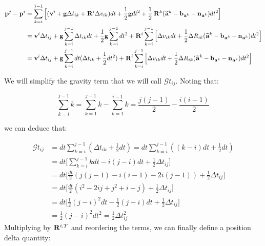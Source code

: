\documentclass[11pt]{article}
\newcommand{\Rot}[2]{\prescript{#1}{}{\bfR}_{#2}}
\newcommand{\noise}{\bfn}
\newcommand{\bias}{\bfb}
\newcommand{\posi}[2]{\prescript{#1}{}{\bfp}_{#2}}
\newcommand{\vel}[2]{\prescript{#1}{}{\bfv}_{#2}}
\newcommand{\acc}[2]{\prescript{#1}{}{\bfa}_{#2}}
\newcommand{\accm}[2]{\prescript{#1}{}{\widetilde{\bfa}}_{#2}}
\newcommand{\grav}{\bfg}
\begin{document}
\begin{equation}
\begin{split}
\posi{}{}^{j} - \posi{}{}^{i} &= \sum_{k=i}^{j-1} \Big[
(\vel{}{}^i + \grav \Delta t_{ik} + \Rot{}{}^i \Delta v_{ik})dt 
+ \frac{1}{2}\grav dt^2 + \frac{1}{2}\Rot{}{}^{k}(\accm{}{}^k - \bias_{\acc{}{}^k} - \noise_{\acc{}{}^k})dt^2 \Big]
\\
&= \vel{}{}^i \Delta t_{ij} + 
\grav\sum_{k=i}^{j-1} \Delta t_{ik} dt + \frac{1}{2}\grav \sum_{k=i}^{j-1} dt^2 +
\Rot{}{}^i\sum_{k=i}^{j-1} \Big[\Delta v_{ik}dt +  \frac{1}{2} \Delta R_{ik} (\accm{}{}^k - \bias_{\acc{}{}^k} - \noise_{\acc{}{}^k})dt^2 \Big]
\\
&= \vel{}{}^i \Delta t_{ij} + 
\grav \sum_{k=i}^{j-1}dt (\Delta t_{ik} + \frac{1}{2}dt^2) +
\Rot{}{}^i\sum_{k=i}^{j-1} \Big[\Delta v_{ik}dt +  \frac{1}{2} \Delta R_{ik} (\accm{}{}^k - \bias_{\acc{}{}^k} - \noise_{\acc{}{}^k})dt^2 \Big]
\end{split}
\end{equation}

We will simplify the gravity term that we will call $\mathcal{G}t_{ij}$. Noting that:

\begin{equation*}
    \sum_{k=i}^{j-1}k = \sum_{k=1}^{j-1}k - \sum_{k=1}^{i-1}k = \frac{j(j-1)}{2} - \frac{i(i-1)}{2} 
\end{equation*}

we can deduce that:

\begin{equation*}
\begin{split}
\mathcal{G}t_{ij} 
&= dt \sum_{k=i}^{j-1}(\Delta t_{ik} + \frac{1}{2}dt) = dt \sum_{k=i}^{j-1}((k -i)dt + \frac{1}{2}dt)
\\
&= dt \Big[ \sum_{k=i}^{j-1} k dt - i(j-i)dt + \frac{1}{2}\Delta t_{ij}  \Big] 
\\
&= dt \Big[ \frac{dt}{2} (j(j-1) - i(i-1) - 2i(j-1)) + \frac{1}{2}\Delta t_{ij} \Big] 
\\
&= dt \Big[ \frac{dt}{2} (i^2 - 2ij + j^2 + i - j) + \frac{1}{2}\Delta t_{ij} \Big] 
\\
&= dt \Big[ \frac{1}{2} (j-i)^2dt - \frac{1}{2}(j - i)dt + \frac{1}{2}\Delta t_{ij} \Big]
\\
&= \frac{1}{2} (j-i)^2dt^2 = \frac{1}{2} \Delta t_{ij}^2
\end{split}
\end{equation*}
Multiplying by $\Rot{}{}^{i,T}$ and reordering the terms, we can finally define a position delta quantity:
\end{document}
